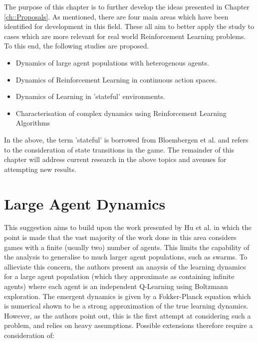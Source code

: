 \documentclass[../sample.tex]{subfiles}
\begin{document}
    The purpose of this chapter is to further develop the ideas presented in Chapter
    \ref{ch::Proposals}. As mentioned, there are four main areas which have been identified for
    development in this field. These all aim to better apply the study to cases which are more
    relevant for real world Reinforcement Learning problems. To this end, the following studies are
    proposed.
    
    \begin{itemize}
        \item Dynamics of large agent populations with heterogenous agents.
        \item Dynamics of Reinforcement Learning in continuous action spaces.
        \item Dynamics of Learning in 'stateful' environments.
        \item Characterisation of complex dynamics using Reinforcement Learning Algorithms
    \end{itemize}

    In the above, the term 'stateful' is borrowed from Bloembergen et al. \cite{Bloembergen2015} and
   refers to the consideration of state transitions in the game. The remainder of this chapter will
   address current research in the above topics and avenues for attempting new results.
   
   \section{Large Agent Dynamics}

    This suggestion aims to build upon the work presented by Hu et
    al. \cite{Hu2019} in which the point is made that the vast
    majority of the work done in this area considers games with a
    finite (usually two) number of agents. This limits the capability
    of the analysis to generalise to much larger agent populations,
    such as swarms. To allieviate this concern, the authors present an
    anaysis of the learning dynamics for a large agent population
    (which they approximate as containing infinite agents) where each
    agent is an independent Q-Learning using Boltzmann
    exploration. The emergent dynamics is given by a Fokker-Planck
    equation which is numerical shown to be a strong approximation of
    the true learning dynamics. However, as the authors point out,
    this is the first attempt at considering such a problem, and
    relies on heavy assumptions.  Possible extensions therefore
    require a consideration of:
\end{document}
